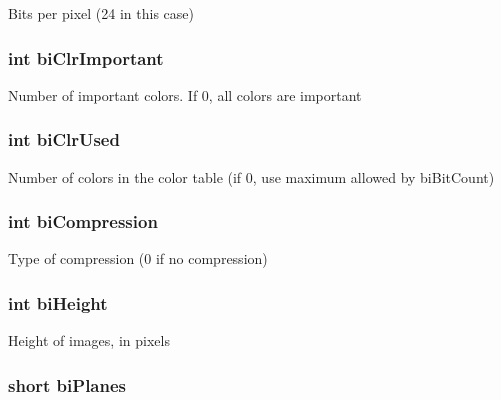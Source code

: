 Bits per pixel (24 in this case) \hypertarget{struct_b_m_p_header_a90f7e4028ab6037cbb7591fac3b83d23}{
\subsubsection[{bi\-Clr\-Important}]{\setlength{\rightskip}{0pt plus 5cm}int bi\-Clr\-Important}}\label{struct_b_m_p_header_a90f7e4028ab6037cbb7591fac3b83d23}
Number of important colors. If 0, all colors are important \hypertarget{struct_b_m_p_header_a536ccf8791198f9379357e5c4b17bc17}{
\subsubsection[{bi\-Clr\-Used}]{\setlength{\rightskip}{0pt plus 5cm}int bi\-Clr\-Used}}\label{struct_b_m_p_header_a536ccf8791198f9379357e5c4b17bc17}
Number of colors in the color table (if 0, use maximum allowed by bi\-Bit\-Count) \hypertarget{struct_b_m_p_header_ad92c25fd24fe77a53ad1cb5bbecf2e74}{
\subsubsection[{bi\-Compression}]{\setlength{\rightskip}{0pt plus 5cm}int bi\-Compression}}\label{struct_b_m_p_header_ad92c25fd24fe77a53ad1cb5bbecf2e74}
Type of compression (0 if no compression) \hypertarget{struct_b_m_p_header_aef892a195d593f028267e1e28995ceea}{
\subsubsection[{bi\-Height}]{\setlength{\rightskip}{0pt plus 5cm}int bi\-Height}}\label{struct_b_m_p_header_aef892a195d593f028267e1e28995ceea}
Height of images, in pixels \hypertarget{struct_b_m_p_header_ae86ef424e75373d65c827825cbd3ad57}{
\subsubsection[{bi\-Planes}]{\setlength{\rightskip}{0pt plus 5cm}short bi\-Planes}}\label{struct_b_m_p_header_ae86ef424e75373d65c827825cbd3ad57}
